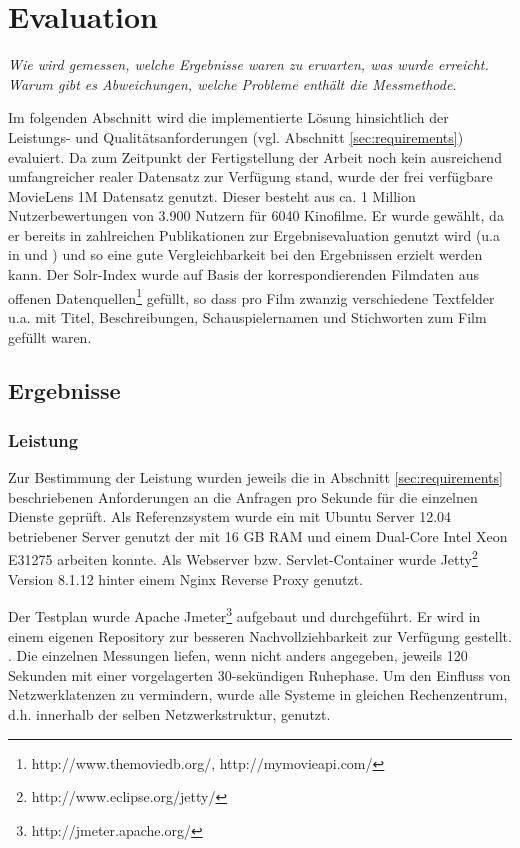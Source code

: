 \section{Evaluation}\label{sec:evaluation}

\textit{Wie wird gemessen, welche Ergebnisse waren zu erwarten, was wurde erreicht. Warum gibt es Abweichungen, welche Probleme enthält die Messmethode.}

Im folgenden Abschnitt wird die implementierte Lösung hinsichtlich der Leistungs- und Qualitätsanforderungen (vgl. Abschnitt \ref{sec:requirements}) evaluiert. Da zum Zeitpunkt der Fertigstellung der Arbeit noch kein ausreichend umfangreicher realer Datensatz zur Verfügung stand, wurde der frei verfügbare MovieLens 1M \citep{movielens1m} Datensatz genutzt. Dieser besteht aus ca. 1 Million Nutzerbewertungen von 3.900 Nutzern für 6040 Kinofilme. Er wurde gewählt, da er bereits in zahlreichen Publikationen zur Ergebnisevaluation genutzt wird (u.a in \citep{Cacheda2011} und \citep{Herlocker:2002:EAD:593967.594047}) und so eine gute Vergleichbarkeit bei den Ergebnissen erzielt werden kann. Der Solr-Index wurde auf Basis der korrespondierenden Filmdaten aus offenen Datenquellen\footnote{http://www.themoviedb.org/, http://mymovieapi.com/} gefüllt, so dass pro Film zwanzig verschiedene Textfelder u.a. mit Titel, Beschreibungen, Schauspielernamen und Stichworten zum Film gefüllt waren.

\subsection{Ergebnisse}

\subsubsection{Leistung}

Zur Bestimmung der Leistung wurden jeweils die in Abschnitt \ref{sec:requirements} beschriebenen Anforderungen an die Anfragen pro Sekunde für die einzelnen Dienste geprüft. Als Referenzsystem wurde ein mit Ubuntu Server 12.04 betriebener Server genutzt der mit 16 GB RAM und einem Dual-Core Intel Xeon E31275 arbeiten konnte. Als Webserver bzw. Servlet-Container wurde Jetty\footnote{http://www.eclipse.org/jetty/} Version 8.1.12 hinter einem Nginx \gls{Reverse Proxy} genutzt.

Der Testplan wurde Apache Jmeter\footnote{http://jmeter.apache.org/} aufgebaut und durchgeführt. Er wird in einem eigenen Repository zur besseren Nachvollziehbarkeit zur Verfügung gestellt. . Die einzelnen Messungen liefen, wenn nicht anders angegeben, jeweils 120 Sekunden mit einer vorgelagerten 30-sekündigen Ruhephase. Um den Einfluss von Netzwerklatenzen zu vermindern, wurde  alle Systeme in gleichen Rechenzentrum, d.h. innerhalb der selben Netzwerkstruktur, genutzt.

